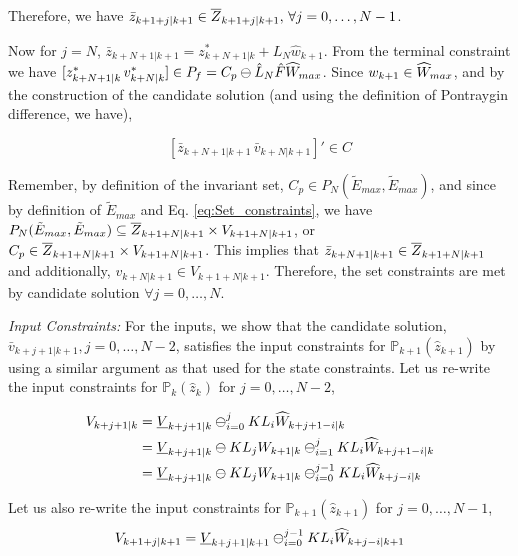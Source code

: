 Therefore, we have $\bar{z}_{k+1+j|k+1} \in \overline{Z}_{k+1+j|k+1},\,\forall j=0,\dotsc,N-1$. 

Now for $j=N$, $\bar{z}_{k+N+1|k+1} = z^{*}_{k+N+1|k} + L_N\hat{w}_{k+1}$. From the terminal constraint we have $[z^{*}_{k+N+1|k}\, v^{*}_{k+N|k}] \in P_f = C_p \ominus \hat{L}_N\hat{F}\widehat{W}_{max}$. Since $w_{k+1} \in \widehat{W}_{max}$, and by the construction of the candidate solution (and using the definition of Pontraygin difference, we have), 

\begin{equation}
\label{eq:CandidateInC}
[\bar{z}_{k+N+1|k+1}\, \bar{v}_{k+N|k+1}]' \in C
\end{equation}

Remember, by definition of the invariant set, $C_p \in P_N(\tilde{E}_{max},\tilde{E}_{max})$, and since by definition of $\tilde{E}_{max}$ and Eq. \ref{eq:Set_constraints}, we have $P_N(\tilde{E}_{max},\tilde{E}_{max}) \subseteq \overline{Z}_{k+1+N|k+1} \times V_{k+1+N|k+1}$, or $C_p \in  \overline{Z}_{k+1+N|k+1} \times {V}_{k+1+N|k+1}$. This implies that $\bar{z}_{k+N+1|k+1} \in \overline{Z}_{k+1+N|k+1}$ and additionally, $v_{k+N|k+1} \in {V}_{k+1+N|k+1}$.
Therefore, the set constraints are met by candidate solution $\forall j=0,\dotsc,N$. 

\textit{Input Constraints:} For the inputs, we show that the candidate solution, $\bar{v}_{k+j+1|k+1}, j=0,\ldots,N-2$, satisfies the input constraints for $\mathbb{P}_{k+1}(\hat{z}_{k+1}) $ by using a similar argument as that used for the state constraints. 
Let us re-write the input constraints for $\mathbb{P}_{k}(\hat{z}_{k})$ for $j=0,\dotsc,N-2$,

\begin{subequations}
\label{eq:V_redef}
\begin{align}
V_{k+j+1|k}&=\underline{V}_{k+j+1|k} \ominus_{i=0}^{j} KL_i\widehat{W}_{k+j+1-i|k} \\
&=\underline{V}_{k+j+1|k} \ominus KL_jW_{k+1|k} \ominus_{i=1}^{j} KL_i\widehat{W}_{k+j+1-i|k} \\
&=\underline{V}_{k+j+1|k} \ominus KL_jW_{k+1|k} \ominus_{i=0}^{j-1} KL_i\widehat{W}_{k+j-i|k}
\end{align}
\end{subequations}

Let us also re-write the input constraints for $\mathbb{P}_{k+1}(\hat{z}_{k+1})$ for $j=0,\dotsc,N-1$,
\begin{equation}
\label{eq:Vjkp1}
V_{k+1+j|k+1}=\underline{V}_{k+j+1|k+1} \ominus_{i=0}^{j-1} KL_i\widehat{W}_{k+j-i|k+1}
\end{equation}

